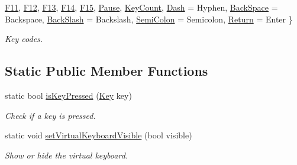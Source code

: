 \begin{DoxyCompactItemize}
\newline
\mbox{\hyperlink{classsf_1_1_keyboard_acb4cacd7cc5802dec45724cf3314a142af9a8de90d90a7a7582269bc5c41f5afd}{F11}}, 
\mbox{\hyperlink{classsf_1_1_keyboard_acb4cacd7cc5802dec45724cf3314a142af9d8807117d946de5e403bcbd4d7161d}{F12}}, 
\mbox{\hyperlink{classsf_1_1_keyboard_acb4cacd7cc5802dec45724cf3314a142a9e28e971941ca2900c1eea17cda50a04}{F13}}, 
\mbox{\hyperlink{classsf_1_1_keyboard_acb4cacd7cc5802dec45724cf3314a142a9a0327a4ef876338d5f3c34c514f190c}{F14}}, 
\newline
\mbox{\hyperlink{classsf_1_1_keyboard_acb4cacd7cc5802dec45724cf3314a142a8949ce79077cc8bf64f4fa42bb6a2808}{F15}}, 
\mbox{\hyperlink{classsf_1_1_keyboard_acb4cacd7cc5802dec45724cf3314a142a95daf340fcc3d5c2846f69d184170d9b}{Pause}}, 
\mbox{\hyperlink{classsf_1_1_keyboard_acb4cacd7cc5802dec45724cf3314a142a93e6ffa0320fe9b2f29aec14a58be36b}{Key\+Count}}, 
\mbox{\hyperlink{classsf_1_1_keyboard_acb4cacd7cc5802dec45724cf3314a142a401a183dcfde0a06cb60fe6c91fa1e39}{Dash}} = Hyphen, 
\newline
\mbox{\hyperlink{classsf_1_1_keyboard_acb4cacd7cc5802dec45724cf3314a142a33aeaab900abcd01eebf2fcc4f6d97e2}{Back\+Space}} = Backspace, 
\mbox{\hyperlink{classsf_1_1_keyboard_acb4cacd7cc5802dec45724cf3314a142a536df84e73859aa44e11e192459470b6}{Back\+Slash}} = Backslash, 
\mbox{\hyperlink{classsf_1_1_keyboard_acb4cacd7cc5802dec45724cf3314a142a460ab09a36f9ed230504b89b9815de88}{Semi\+Colon}} = Semicolon, 
\mbox{\hyperlink{classsf_1_1_keyboard_acb4cacd7cc5802dec45724cf3314a142ac291de81bdee518d636bc359f2ca77de}{Return}} = Enter
 \}
\begin{DoxyCompactList}\small\item\em Key codes. \end{DoxyCompactList}\end{DoxyCompactItemize}
\subsection*{Static Public Member Functions}
\begin{DoxyCompactItemize}
\item 
static bool \mbox{\hyperlink{classsf_1_1_keyboard_a80a04b2f53005886957f49eee3531599}{is\+Key\+Pressed}} (\mbox{\hyperlink{classsf_1_1_keyboard_acb4cacd7cc5802dec45724cf3314a142}{Key}} key)
\begin{DoxyCompactList}\small\item\em Check if a key is pressed. \end{DoxyCompactList}\item 
static void \mbox{\hyperlink{classsf_1_1_keyboard_ad61fee7e793242d444a8c5acd662fe5b}{set\+Virtual\+Keyboard\+Visible}} (bool visible)
\begin{DoxyCompactList}\small\item\em Show or hide the virtual keyboard. \end{DoxyCompactList}\end{DoxyCompactItemize}


